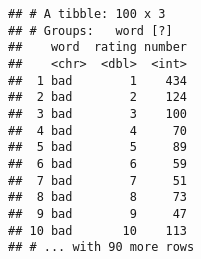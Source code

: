 \documentclass[]{article}
\newenvironment{Shaded}{\begin{snugshade}}{\end{snugshade}}
\newcommand{\KeywordTok}[1]{\textcolor[rgb]{0.13,0.29,0.53}{\textbf{#1}}}
\newcommand{\DataTypeTok}[1]{\textcolor[rgb]{0.13,0.29,0.53}{#1}}
\newcommand{\DecValTok}[1]{\textcolor[rgb]{0.00,0.00,0.81}{#1}}
\newcommand{\StringTok}[1]{\textcolor[rgb]{0.31,0.60,0.02}{#1}}
\newcommand{\OperatorTok}[1]{\textcolor[rgb]{0.81,0.36,0.00}{\textbf{#1}}}
\newcommand{\NormalTok}[1]{#1}
\begin{document}
\begin{Shaded}
\end{Shaded}

\begin{verbatim}
## # A tibble: 100 x 3
## # Groups:   word [?]
##    word  rating number
##    <chr>  <dbl>  <int>
##  1 bad        1    434
##  2 bad        2    124
##  3 bad        3    100
##  4 bad        4     70
##  5 bad        5     89
##  6 bad        6     59
##  7 bad        7     51
##  8 bad        8     73
##  9 bad        9     47
## 10 bad       10    113
## # ... with 90 more rows
\end{verbatim}
\end{document}
